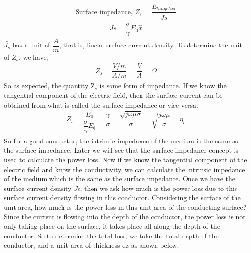 \begin{align}
\text{Surface impedance, }Z_{s}=\dfrac{E_{tangetial}}{\bar{J}s}
\end{align}
\begin{align}
\bar{J}s=\dfrac{\sigma}{\gamma}E_0\hat{x}
\end{align}
$\bar{J_{s}}$ has a unit of $\dfrac{A}{m}$, that is, linear surface current density.
To determine the unit of $Z_{s}$, we have;
\begin{align}
Z_{s}=\dfrac{V/m}{A/m}=\dfrac{V}{A}=\Omega
\end{align}
So as expected, the quantity Z$_{s}$ is some form of impedance. If we know the tangential component of the electric field, then the surface current can be obtained from what is called the surface impedance or vice versa.
\begin{align}
Z_{s}=\dfrac{E_0}{\dfrac{\sigma}{\gamma} E_0}=\dfrac{\gamma}{\sigma}=\dfrac{\sqrt{j\omega\mu\sigma}}{\sigma}=\sqrt{\dfrac{j\omega\mu}{\sigma}}=\eta_{c}
\end{align}
So for a good conductor, the intrinsic impedance of the medium is the same as the surface impedance. Later we will see that the surface impedance concept is used to calculate the power loss. Now if we know the tangential component of the electric field and know the conductivity, we can calculate the intrinsic impedance of the medium which is the same as the surface impedance.
Once we have the surface current density $\bar{J}$s, then we ask how much is the power loss due to this surface current density flowing in this conductor. Considering the surface of the unit area, how much is the power loss in this unit area of the conducting surface? Since the current is flowing into the depth of the conductor, the power loss is not only taking place on the surface, it takes place all along the depth of the conductor. So to determine the total loss, we take the total depth of the conductor, and a unit area of thickness dz as shown below.

